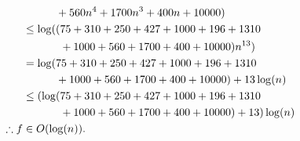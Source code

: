 \documentclass[12pt, a4paper]{article}
\newcommand*\myphantomrel[1]{\mathrel{\phantom{#1}}}
\begin{document}
\begin{enumerate}
\begin{enumerate}
\begin{align*}
					         & \myphantomrel{=} \hphantom{\log(} + 560n^4 + 1700n^3 + 400n + 10000) \\
					         & \leq \log((75 + 310 + 250 + 427 + 1000 + 196 + 1310 \\
					         & \myphantomrel{\leq} \hphantom{\log((} + 1000 + 560 + 1700 + 400 + 10000)n^{13}) \\
					         & = \log(75 + 310 + 250 + 427 + 1000 + 196 + 1310 \\
					         & \myphantomrel{=} \hphantom{\log(} + 1000 + 560 + 1700 + 400 + 10000) + 13\log(n) \\
					         & \leq (\log(75 + 310 + 250 + 427 + 1000 + 196 + 1310 \\
					         & \myphantomrel{\leq} \hphantom{(\log(} + 1000 + 560 + 1700 + 400 + 10000) + 13)\log(n) \\
				\therefore f & \in O(\log(n)).
			\end{align*} \label{1(f)}
		\end{enumerate}
		

\end{enumerate}
\end{document}
